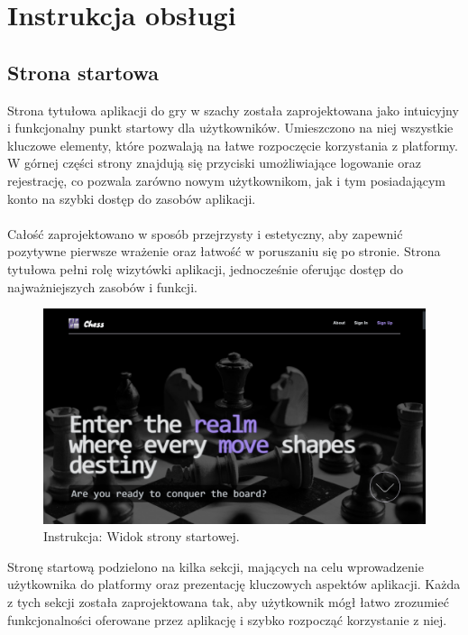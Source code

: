 \documentclass[12pt,a4paper]{article}
\begin{document}
\newpage

\section{Instrukcja obsługi}

\subsection{Strona startowa}

\noindent
Strona tytułowa aplikacji do gry w szachy została zaprojektowana jako intuicyjny i funkcjonalny punkt startowy dla użytkowników. Umieszczono na niej wszystkie kluczowe elementy, które pozwalają na łatwe rozpoczęcie korzystania z platformy. W górnej części strony znajdują się przyciski umożliwiające logowanie oraz rejestrację, co pozwala zarówno nowym użytkownikom, jak i tym posiadającym konto na szybki dostęp do zasobów aplikacji.
\\\\
Całość zaprojektowano w sposób przejrzysty i estetyczny, aby zapewnić pozytywne pierwsze wrażenie oraz łatwość w poruszaniu się po stronie. Strona tytułowa pełni rolę wizytówki aplikacji, jednocześnie oferując dostęp do najważniejszych zasobów i funkcji.

\vspace{0.5cm}
\begin{figure}[h!]
    \centering
    \includegraphics[width=1\textwidth]{images/ins_hero.png}
    \caption{Instrukcja: Widok strony startowej.}
\end{figure}
\vspace{0.5cm}

\noindent
Stronę startową podzielono na kilka sekcji, mających na celu wprowadzenie użytkownika do platformy oraz prezentację kluczowych aspektów aplikacji. Każda z tych sekcji została zaprojektowana tak, aby użytkownik mógł łatwo zrozumieć funkcjonalności oferowane przez aplikację i szybko rozpocząć korzystanie z niej.
\end{document}
